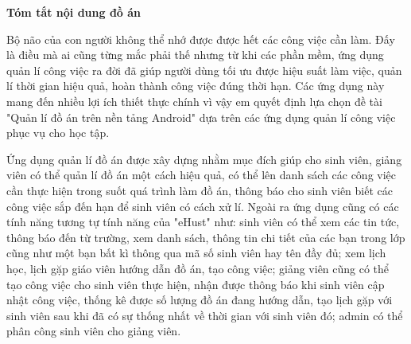 \documentclass[../Main.tex]{subfiles}
\begin{document}
\begin{center}
    \Large{\textbf{Tóm tắt nội dung đồ án}}\\
\end{center}
\vspace{1cm}

Bộ não của con người không thể nhớ được được hết các công việc cần làm. Đấy là điều mà ai cũng từng mắc phải thế nhưng từ khi các phần mềm, ứng dụng quản lí công việc ra đời đã giúp người dùng tối ưu được hiệu suất làm việc, quản lí thời gian hiệu quả, hoàn thành công việc đúng thời hạn. Các ứng dụng này mang đến nhiều lợi ích thiết thực chính vì vậy em quyết định lựa chọn đề tài "Quản lí đồ án trên nền tảng Android" dựa trên các ứng dụng quản lí công việc phục vụ cho học tập. 

Ứng dụng quản lí đồ án được xây dựng nhằm mục đích giúp cho sinh viên, giảng viên có thể quản lí đồ án một cách hiệu quả, có thể lên danh sách các công việc cần thực hiện trong suốt quá trình làm đồ án, thông báo cho sinh viên biết các công việc sắp đến hạn để sinh viên có cách xử lí. Ngoài ra ứng dụng cũng có các tính năng tương tự tính năng của "eHust" như: sinh viên có thể xem các tin tức, thông báo đến từ trường, xem danh sách, thông tin chi tiết của các bạn trong lớp cũng như một bạn bất kì thông qua mã số sinh viên hay tên đầy đủ; xem lịch học, lịch gặp giáo viên hướng dẫn đồ án, tạo công việc; giảng viên cũng có thể tạo công việc cho sinh viên thực hiện, nhận được thông báo khi sinh viên cập nhật công việc, thống kê được số lượng đồ án đang hướng dẫn, tạo lịch gặp với sinh viên sau khi đã có sự thống nhất về thời gian với sinh viên đó; admin có thể phân công sinh viên cho giảng viên. 
\end{document}
